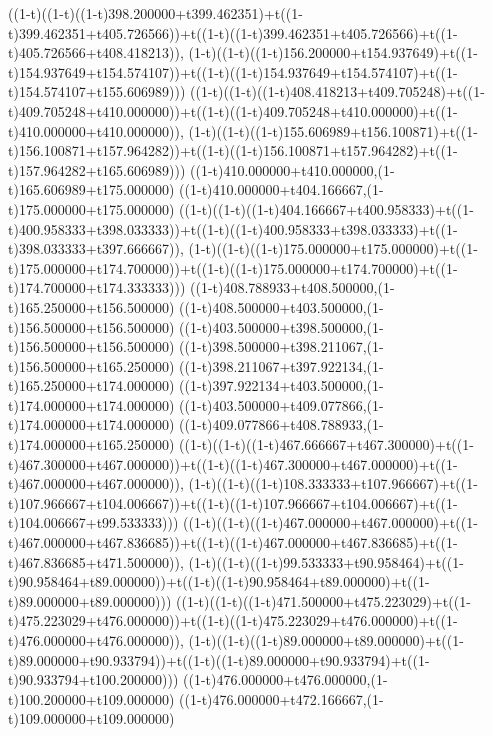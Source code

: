 ((1-t)((1-t)((1-t)398.200000+t399.462351)+t((1-t)399.462351+t405.726566))+t((1-t)((1-t)399.462351+t405.726566)+t((1-t)405.726566+t408.418213)),                                     (1-t)((1-t)((1-t)156.200000+t154.937649)+t((1-t)154.937649+t154.574107))+t((1-t)((1-t)154.937649+t154.574107)+t((1-t)154.574107+t155.606989)))
((1-t)((1-t)((1-t)408.418213+t409.705248)+t((1-t)409.705248+t410.000000))+t((1-t)((1-t)409.705248+t410.000000)+t((1-t)410.000000+t410.000000)),                                     (1-t)((1-t)((1-t)155.606989+t156.100871)+t((1-t)156.100871+t157.964282))+t((1-t)((1-t)156.100871+t157.964282)+t((1-t)157.964282+t165.606989)))
((1-t)410.000000+t410.000000,(1-t)165.606989+t175.000000)
((1-t)410.000000+t404.166667,(1-t)175.000000+t175.000000)
((1-t)((1-t)((1-t)404.166667+t400.958333)+t((1-t)400.958333+t398.033333))+t((1-t)((1-t)400.958333+t398.033333)+t((1-t)398.033333+t397.666667)),                                     (1-t)((1-t)((1-t)175.000000+t175.000000)+t((1-t)175.000000+t174.700000))+t((1-t)((1-t)175.000000+t174.700000)+t((1-t)174.700000+t174.333333)))
((1-t)408.788933+t408.500000,(1-t)165.250000+t156.500000)
((1-t)408.500000+t403.500000,(1-t)156.500000+t156.500000)
((1-t)403.500000+t398.500000,(1-t)156.500000+t156.500000)
((1-t)398.500000+t398.211067,(1-t)156.500000+t165.250000)
((1-t)398.211067+t397.922134,(1-t)165.250000+t174.000000)
((1-t)397.922134+t403.500000,(1-t)174.000000+t174.000000)
((1-t)403.500000+t409.077866,(1-t)174.000000+t174.000000)
((1-t)409.077866+t408.788933,(1-t)174.000000+t165.250000)
((1-t)((1-t)((1-t)467.666667+t467.300000)+t((1-t)467.300000+t467.000000))+t((1-t)((1-t)467.300000+t467.000000)+t((1-t)467.000000+t467.000000)),                                     (1-t)((1-t)((1-t)108.333333+t107.966667)+t((1-t)107.966667+t104.006667))+t((1-t)((1-t)107.966667+t104.006667)+t((1-t)104.006667+t99.533333)))
((1-t)((1-t)((1-t)467.000000+t467.000000)+t((1-t)467.000000+t467.836685))+t((1-t)((1-t)467.000000+t467.836685)+t((1-t)467.836685+t471.500000)),                                     (1-t)((1-t)((1-t)99.533333+t90.958464)+t((1-t)90.958464+t89.000000))+t((1-t)((1-t)90.958464+t89.000000)+t((1-t)89.000000+t89.000000)))
((1-t)((1-t)((1-t)471.500000+t475.223029)+t((1-t)475.223029+t476.000000))+t((1-t)((1-t)475.223029+t476.000000)+t((1-t)476.000000+t476.000000)),                                     (1-t)((1-t)((1-t)89.000000+t89.000000)+t((1-t)89.000000+t90.933794))+t((1-t)((1-t)89.000000+t90.933794)+t((1-t)90.933794+t100.200000)))
((1-t)476.000000+t476.000000,(1-t)100.200000+t109.000000)
((1-t)476.000000+t472.166667,(1-t)109.000000+t109.000000)
